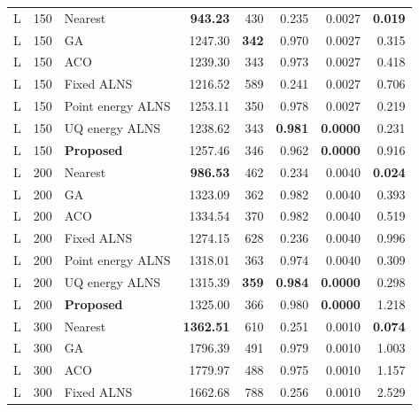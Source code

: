 \begin{longtable}{@{}rrlrrrrr@{}}
L & 150 & Nearest & \textbf{943.23} & 430 & 0.235 & 0.0027 & \textbf{0.019} \\

L & 150 & GA & 1247.30 & \textbf{342} & 0.970 & 0.0027 & 0.315 \\

L & 150 & ACO & 1239.30 & 343 & 0.973 & 0.0027 & 0.418 \\

L & 150 & Fixed ALNS & 1216.52 & 589 & 0.241 & 0.0027 & 0.706 \\

L & 150 & Point energy ALNS & 1253.11 & 350 & 0.978 & 0.0027 & 0.219 \\

L & 150 & UQ energy ALNS & 1238.62 & 343 & \textbf{0.981} & \textbf{0.0000} & 0.231 \\
\rowcolor{gray!10}
L & 150 & \textbf{Proposed} & 1257.46 & 346 & 0.962 & \textbf{0.0000} & 0.916 \\
\addlinespace[2pt]

L & 200 & Nearest & \textbf{986.53} & 462 & 0.234 & 0.0040 & \textbf{0.024} \\

L & 200 & GA & 1323.09 & 362 & 0.982 & 0.0040 & 0.393 \\

L & 200 & ACO & 1334.54 & 370 & 0.982 & 0.0040 & 0.519 \\

L & 200 & Fixed ALNS & 1274.15 & 628 & 0.236 & 0.0040 & 0.996 \\

L & 200 & Point energy ALNS & 1318.01 & 363 & 0.974 & 0.0040 & 0.309 \\

L & 200 & UQ energy ALNS & 1315.39 & \textbf{359} & \textbf{0.984} & \textbf{0.0000} & 0.298 \\
\rowcolor{gray!10}
L & 200 & \textbf{Proposed} & 1325.00 & 366 & 0.980 & \textbf{0.0000} & 1.218 \\
\addlinespace[2pt]

L & 300 & Nearest & \textbf{1362.51} & 610 & 0.251 & 0.0010 & \textbf{0.074} \\

L & 300 & GA & 1796.39 & 491 & 0.979 & 0.0010 & 1.003 \\

L & 300 & ACO & 1779.97 & 488 & 0.975 & 0.0010 & 1.157 \\

L & 300 & Fixed ALNS & 1662.68 & 788 & 0.256 & 0.0010 & 2.529 \\


\end{longtable}
